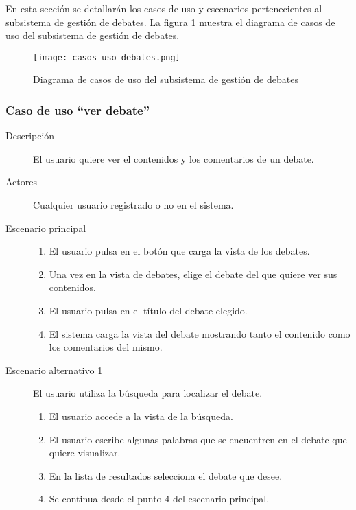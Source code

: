 En esta sección se detallarán los casos de uso y escenarios pertenecientes al subsistema de gestión de debates.
La figura \ref{fig:casos_uso_subsistema_debates} muestra el diagrama de casos de uso del subsistema de gestión de debates.

\begin{figure}[h]
\centering
\texttt{[image: casos\_uso\_debates.png]}
\caption{Diagrama de casos de uso del subsistema de gestión de debates}
\label{fig:casos_uso_subsistema_debates}
\end{figure}


\subsubsection{Caso de uso ``ver debate''}
\begin{description}
\item[Descripción] 				El usuario quiere ver el contenidos y los comentarios de un debate.
\item[Actores]					Cualquier usuario registrado o no en el sistema.
\item[Escenario principal]	 	\hfill
								\begin{enumerate}
								\item El usuario pulsa en el botón que carga la vista de los debates.
								\item Una vez en la vista de debates, elige el debate del que quiere ver sus contenidos.
								\item El usuario pulsa en el título del debate elegido.
								\item El sistema carga la vista del debate mostrando tanto el contenido como los comentarios del mismo.
								\end{enumerate}
\item[Escenario alternativo 1]	El usuario utiliza la búsqueda para localizar el debate.
								\begin{enumerate}
								\item El usuario accede a la vista de la búsqueda.
								\item El usuario escribe algunas palabras que se encuentren en el debate que quiere visualizar.
								\item En la lista de resultados selecciona el debate que desee.
								\item Se continua desde el punto 4 del escenario principal.
								\end{enumerate}
\end{description}


